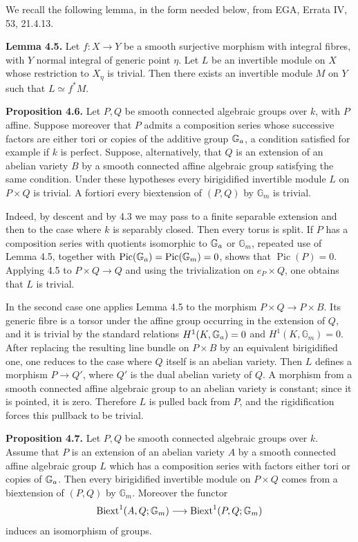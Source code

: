 \documentclass[11pt]{article}
\providecommand{\Pic}{\operatorname{Pic}}
\providecommand{\Gm}{\mathbb G_m}
\begin{document}
We recall the following lemma, in the form needed below, from EGA, Errata IV, 53, 21.4.13.

\textbf{Lemma 4.5.}  Let \(f:X\to Y\) be a smooth surjective morphism with integral fibres, with \(Y\) normal integral of generic point \(\eta\).  Let \(L\) be an invertible module on \(X\) whose restriction to \(X_\eta\) is trivial.  Then there exists an invertible module \(M\) on \(Y\) such that \(L\simeq f^*M\).

\textbf{Proposition 4.6.}  Let \(P,Q\) be smooth connected algebraic groups over \(k\), with \(P\) affine.  Suppose moreover that \(P\) admits a composition series whose successive factors are either tori or copies of the additive group \(\mathbb G_a\), a condition satisfied for example if \(k\) is perfect.  Suppose, alternatively, that \(Q\) is an extension of an abelian variety \(B\) by a smooth connected affine algebraic group satisfying the same condition.  Under these hypotheses every birigidified invertible module \(L\) on \(P\times Q\) is trivial.  A fortiori every biextension of \((P,Q)\) by \(\Gm\) is trivial.

Indeed, by descent and by 4.3 we may pass to a finite separable extension and then to the case where \(k\) is separably closed.  Then every torus is split.  If \(P\) has a composition series with quotients isomorphic to \(\mathbb G_a\) or \(\Gm\), repeated use of Lemma 4.5, together with \(\Pic(\Ga)=\Pic(\Gm)=0\), shows that \(\Pic(P)=0\).  Applying 4.5 to \(P\times Q\to Q\) and using the trivialization on \(e_P\times Q\), one obtains that \(L\) is trivial.

In the second case one applies Lemma 4.5 to the morphism \(P\times Q\to P\times B\).  Its generic fibre is a torsor under the affine group occurring in the extension of \(Q\), and it is trivial by the standard relations \(H^1(K,\mathbb G_a)=0\) and \(H^1(K,\Gm)=0\).  After replacing the resulting line bundle on \(P\times B\) by an equivalent birigidified one, one reduces to the case where \(Q\) itself is an abelian variety.  Then \(L\) defines a morphism \(P\to Q'\), where \(Q'\) is the dual abelian variety of \(Q\).  A morphism from a smooth connected affine algebraic group to an abelian variety is constant; since it is pointed, it is zero.  Therefore \(L\) is pulled back from \(P\), and the rigidification forces this pullback to be trivial.

\textbf{Proposition 4.7.}  Let \(P,Q\) be smooth connected algebraic groups over \(k\).  Assume that \(P\) is an extension of an abelian variety \(A\) by a smooth connected affine algebraic group \(L\) which has a composition series with factors either tori or copies of \(\mathbb G_a\).  Then every birigidified invertible module on \(P\times Q\) comes from a biextension of \((P,Q)\) by \(\Gm\).  Moreover the functor
\[
  \Biext^1(A,Q;\Gm)\longrightarrow \Biext^1(P,Q;\Gm)
\]
induces an isomorphism of groups.
\end{document}
